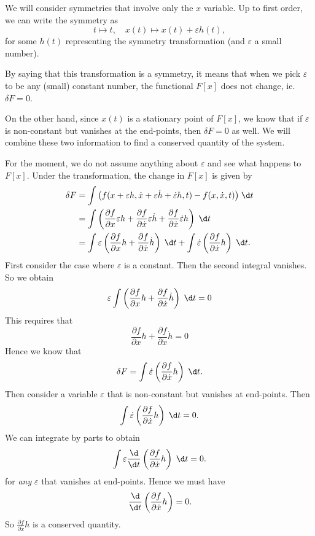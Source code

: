\documentclass[a4paper]{article}
\begin{document}
We will consider symmetries that involve only the $x$ variable. Up to first order, we can write the symmetry as
\[
  t \mapsto t,\quad x(t)\mapsto x(t) + \varepsilon h(t),
\]
for some $h(t)$ representing the symmetry transformation (and $\varepsilon$ a small number).

By saying that this transformation is a symmetry, it means that when we pick $\varepsilon$ to be any (small) constant number, the functional $F[x]$ does not change, ie. $\delta F = 0$.

On the other hand, since $x(t)$ is a stationary point of $F[x]$, we know that if $\varepsilon$ is non-constant but vanishes at the end-points, then $\delta F = 0$ as well. We will combine these two information to find a conserved quantity of the system.

For the moment, we do not assume anything about $\varepsilon$ and see what happens to $F[x]$. Under the transformation, the change in $F[x]$ is given by
\begin{align*}
  \delta F &= \int \big(f(x + \varepsilon h, \dot{x} + \varepsilon \dot{h} + \dot{\varepsilon} h, t) - f(x, \dot{x}, t)\big)\;\d t\\
  &= \int\left(\frac{\partial f}{\partial x}\varepsilon h + \frac{\partial f}{\partial \dot{x}}\varepsilon \dot{h} + \frac{\partial f}{\partial \dot{x}}\dot{\varepsilon} h\right)\;\d t\\
  &= \int \varepsilon\left(\frac{\partial f}{\partial x}h + \frac{\partial f}{\partial \dot{x}}\dot{h}\right)\;\d t + \int \dot{\varepsilon} \left(\frac{\partial f}{\partial \dot{x}}h\right)\;\d t.
\end{align*}
First consider the case where $\varepsilon$ is a constant. Then the second integral vanishes. So we obtain
\[
  \varepsilon \int \left(\frac{\partial f}{\partial x}h + \frac{\partial f}{\partial\dot{x}}\dot{h}\right)\;\d t = 0
\]
This requires that
\[
  \frac{\partial f}{\partial x}h + \frac{\partial f}{\partial\dot{x}}\dot{h} = 0
\]
Hence we know that
\[
  \delta F = \int\dot{\varepsilon}\left(\frac{\partial f}{\partial \dot{x}}h\right)\;\d t.
\]
Then consider a variable $\varepsilon$ that is non-constant but vanishes at end-points. Then
\[
  \int\dot{\varepsilon}\left(\frac{\partial f}{\partial \dot{x}}h\right)\;\d t = 0.
\]
We can integrate by parts to obtain
\[
  \int \varepsilon \frac{\d}{\d t}\left(\frac{\partial f}{\partial \dot{x}}h\right)\;\d t = 0.
\]
for \emph{any} $\varepsilon$ that vanishes at end-points. Hence we must have
\[
  \frac{\d}{\d t}\left(\frac{\partial f}{\partial \dot{x}}h\right) = 0.
\]
So $\frac{\partial f}{\partial \dot{x}}h$ is a conserved quantity.
\end{document}
